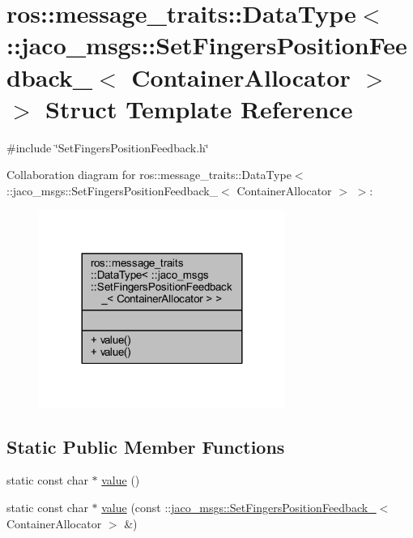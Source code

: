 \hypertarget{structros_1_1message__traits_1_1DataType_3_01_1_1jaco__msgs_1_1SetFingersPositionFeedback___3_01ContainerAllocator_01_4_01_4}{}\section{ros\+:\+:message\+\_\+traits\+:\+:Data\+Type$<$ \+:\+:jaco\+\_\+msgs\+:\+:Set\+Fingers\+Position\+Feedback\+\_\+$<$ Container\+Allocator $>$ $>$ Struct Template Reference}
\label{structros_1_1message__traits_1_1DataType_3_01_1_1jaco__msgs_1_1SetFingersPositionFeedback___3_01ContainerAllocator_01_4_01_4}


{\ttfamily \#include \char`\"{}Set\+Fingers\+Position\+Feedback.\+h\char`\"{}}



Collaboration diagram for ros\+:\+:message\+\_\+traits\+:\+:Data\+Type$<$ \+:\+:jaco\+\_\+msgs\+:\+:Set\+Fingers\+Position\+Feedback\+\_\+$<$ Container\+Allocator $>$ $>$\+:
\nopagebreak
\begin{figure}[H]
\begin{center}
\leavevmode
\includegraphics[width=228pt]{d8/dc5/structros_1_1message__traits_1_1DataType_3_01_1_1jaco__msgs_1_1SetFingersPositionFeedback___3_0173e4868987e503f369f6917fa8cb10f5}
\end{center}
\end{figure}
\subsection*{Static Public Member Functions}
\begin{DoxyCompactItemize}
\item 
static const char $\ast$ \hyperlink{structros_1_1message__traits_1_1DataType_3_01_1_1jaco__msgs_1_1SetFingersPositionFeedback___3_01ContainerAllocator_01_4_01_4_af0494d4a1d9b1046e1dde58778f112a3}{value} ()
\item 
static const char $\ast$ \hyperlink{structros_1_1message__traits_1_1DataType_3_01_1_1jaco__msgs_1_1SetFingersPositionFeedback___3_01ContainerAllocator_01_4_01_4_abd5ae01fb5d175bc8d47a1e4cdb9edc1}{value} (const \+::\hyperlink{structjaco__msgs_1_1SetFingersPositionFeedback__}{jaco\+\_\+msgs\+::\+Set\+Fingers\+Position\+Feedback\+\_\+}$<$ Container\+Allocator $>$ \&)
\end{DoxyCompactItemize}


